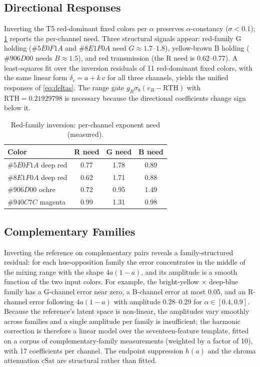 \subsection{Directional Responses}
Inverting the T5 red-dominant fixed colors per $\alpha$ preserves $\alpha$-constancy ($\sigma<0.1$); \cref{tab:d4} reports the per-channel need. Three structural signals appear: red-family G holding ($\#5E0F1A$ and $\#8E1F0A$ need $G\approx1.7$--$1.8$), yellow-brown B holding ($\#906D00$ needs $B\approx1.5$), and red transmission (the R need is 0.62--0.77). A least-squares fit over the inversion residuals of 11 red-dominant fixed colors, with the same linear form $\delta_{c}=a+k\,v$ for all three channels, yields the unified responses of \cref{eq:deltas}. The range gate $g_{R}\sigma_{8}(v_{R}-\mathrm{RTH})$ with $\mathrm{RTH}=0.21929798$ is necessary because the directional coefficients change sign below it.

\begin{table}[t]
\centering
\small
\caption{Red-family inversion: per-channel exponent need (measured).}
\label{tab:d4}
\begin{tabular}{lccc}
\toprule
Color & R need & G need & B need \\
\midrule
$\#5E0F1A$ deep red & 0.77 & 1.78 & 0.89 \\
$\#8E1F0A$ deep red & 0.62 & 1.71 & 0.88 \\
$\#906D00$ ochre & 0.72 & 0.95 & 1.49 \\
$\#940C7C$ magenta & 0.99 & 1.31 & 0.98 \\
\bottomrule
\end{tabular}
\end{table}

\subsection{Complementary Families}
Inverting the reference on complementary pairs reveals a family-structured residual: for each hue-opposition family the error concentrates in the middle of the mixing range with the shape $4a(1-a)$, and its amplitude is a smooth function of the two input colors. For example, the bright-yellow $\times$ deep-blue family has a G-channel error near zero, a B-channel error at most 0.05, and an R-channel error following $4a(1-a)$ with amplitude 0.28--0.29 for $\alpha\in[0.4,0.9]$. Because the reference's latent space is non-linear, the amplitudes vary smoothly across families and a single amplitude per family is insufficient; the harmonic correction is therefore a linear model over the seventeen-feature template, fitted on a corpus of complementary-family measurements (weighted by a factor of 10), with 17 coefficients per channel. The endpoint suppression $h(a)$ and the chroma attenuation $\mathrm{cSat}$ are structural rather than fitted.
